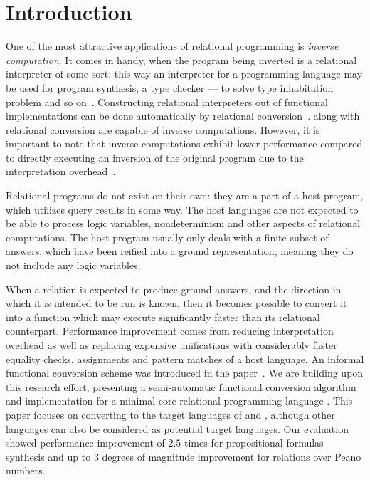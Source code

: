 \section{Introduction}
One of the most attractive applications of relational programming is \emph{inverse computation}.
It comes in handy, when the program being inverted is a relational interpreter of some sort: this way an interpreter for a programming language may be used for program synthesis, a type checker --- to solve type inhabitation problem and so on~\cite{Untagged, lozov2019relational}.
Constructing relational interpreters out of functional implementations can be done automatically by relational conversion~\cite{lozov2018typed}.
\mk along with relational conversion are capable of inverse computations.
However, it is important to note that inverse computations exhibit lower performance compared to directly executing an inversion of the original program due to the interpretation overhead~\cite{RevURA,SemanticsModifiers1}.

Relational programs do not exist on their own: they are a part of a host program, which utilizes query results in some way.
The host languages are not expected to be able to process logic variables, nondeterminism and other aspects of relational computations.
The host program usually only deals with a finite subset of answers, which have been reified into a ground representation, meaning they do not include any logic variables.

When a relation is expected to produce ground answers, and the direction in which it is intended to be run is known, then it becomes possible to convert it into a function which may execute significantly faster than its relational counterpart.
Performance improvement comes from reducing interpretation overhead as well as replacing expensive unifications with considerably faster equality checks, assignments and pattern matches of a host language.
An informal functional conversion scheme was introduced in the paper~\cite{verbitskaia2022direction}.
We are building upon this research effort, presenting a semi-automatic functional conversion algorithm and implementation for a minimal core relational programming language \micro.
This paper focuses on converting to the target languages of \haskell and \ocaml, although other languages can also be considered as potential target languages.
Our evaluation showed performance improvement of $2.5$ times for propositional formulas synthesis and up to $3$ degrees of magnitude improvement for relations over Peano numbers. 